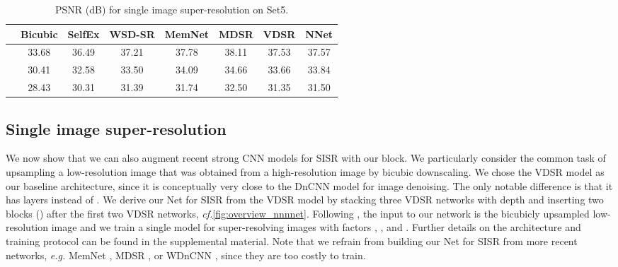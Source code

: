 \documentclass{article}
\makeatletter
\newcommand{\eg}{\emph{e.\thinspace{}g.}\@\xspace}
\newcommand{\cf}{\emph{cf.}\@\xspace}
\makeatother
\begin{document}
\begin{table}[b]
	\vspace{-0.5em}
	\caption{PSNR (dB) for single image super-resolution on Set5.}
	\label{tab:superresolution}
	\centering
	\footnotesize
	\smallskip
	\begin{tabularx}{\linewidth}{@{}X S[table-format=2.2] @{\hspace{1.2cm}} S[table-format=2.2] @{\hspace{0.7cm}} S[table-format=2.2] @{\hspace{0.7cm}} S[table-format=2.2] @{\hspace{0.7cm}} S[table-format=2.2] @{\hspace{1.2cm}} S[table-format=2.2] @{\hspace{0.7cm}} S[table-format=2.2]@{}}
		\toprule
						& {Bicubic} 	& {SelfEx}	&  {WSD-SR} 	& {MemNet} 	& {MDSR}	& {VDSR} & {NNet}	\\
		\midrule
		  		& 33.68		& 36.49		& 37.21		& 37.78		& 38.11	& 37.53	&  37.57 \\
		  		& 30.41		& 32.58		& 33.50		& 34.09		& 34.66	& 33.66	&  33.84 \\
		  		& 28.43		& 30.31		& 31.39		& 31.74		& 32.50	& 31.35	&  31.50 \\

		\bottomrule
	\end{tabularx}
\end{table}

\subsection{Single image super-resolution}
We now show that we can also augment recent strong CNN models for SISR with our  block.
We particularly consider the common task \cite{Huang:2015:SelfEx,Kim:2016:VDSR} of upsampling a low-resolution image that was obtained from a high-resolution image by bicubic downscaling.
We chose the VDSR model \cite{Kim:2016:VDSR} as our baseline architecture, since
it is conceptually very close to the DnCNN model for image denoising.
The only notable difference is that it has  layers instead of .
We derive our Net for SISR from the VDSR model by stacking three VDSR networks with depth  and inserting two  blocks () after the first two VDSR networks, \cf \cref{fig:overview_nnnnet}. 
Following \cite{Kim:2016:VDSR}, the input to our network is the bicubicly upsampled low-resolution image
and we train a single model for super-resolving images with factors , , and .
Further details on the architecture and training protocol can be found in the supplemental material.
Note that we refrain from building our Net for SISR from more recent networks, \eg MemNet \cite{Tai:2017:MPM}, MDSR \cite{Lim:2017:EDR}, or WDnCNN \cite{Bae:2017:BDR}, since they are too costly to train.
\end{document}
